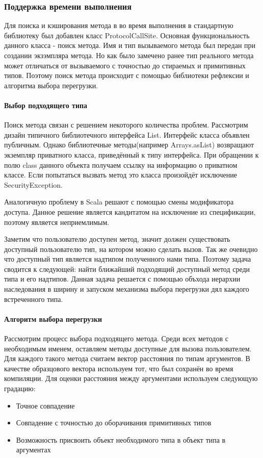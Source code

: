 \subsubsection{Поддержка времени выполнения}
Для поиска и кэширования метода в во время выполнения в стандартную библиотеку был добавлен класс ProtocolCallSite. Основная функциональность данного класса - поиск метода. Имя и тип вызываемого метода был передан при создании экзэмпляра метода. Но как было замечено ранее тип реального метода может отличаться от вызываемого с точностью до стираемых и примитивных типов. Поэтому поиск метода происходит с помощью библиотеки рефлексии и алгоритма выбора перегрузки.

\paragraph{Выбор подходящего типа}
Поиск метода связан с решением некоторого количества проблем. Рассмотрим дизайн типичного библиотечного интерфейса List. Интерфейс класса объявлен публичным. Однако библиотечные методы(например Arrays.asList) возвращают экземпляр приватного класса, приведённый к типу интерфейса. При обращении к полю class данного объекта получаем ссылку на информацию о приватном классе. Если попытаться вызвать метод это класса произойдёт исключение SecurityException.

Аналогичную проблему в Scala решают с помощью смены модификатора доступа. Данное решение является кандитатом на исключение из спецификации, поэтому является неприемлимым.

Заметим что пользователю доступен метод, значит должен существовать доступный пользователю тип, на котором можно сделать вызов. Так же очевидно что доступный тип является надтипом полученного нами типа. Поэтому задача сводится к следующей: найти ближайший подходящий доступный метод среди типа и его надтипов. Данная задача решается с помощью объхода иерархии наследования в ширину и запуском механизма выбора перегрузки дял каждого встреченного типа.

\paragraph{Алгоритм выбора перегрузки}
Рассмотрим процесс выбора подходящего метода. Среди всех методов с необходимым именем, оставляем методы доступные для вызова пользователем. Для каждого такого метода считаем вектор расстояния по типам аргументов. В качестве образцового вектора используем тот, что был сохранён во время компиляции. Для оценки расстояния между аргументами используем следующую градацию:
\begin{itemize}
    \item Точное совпадение
    \item Совпадение с точностью до оборачивания примитивных типов
    \item Возможность присвоить объект необходимого типа в объект типа в аргументах
\end{itemize}

